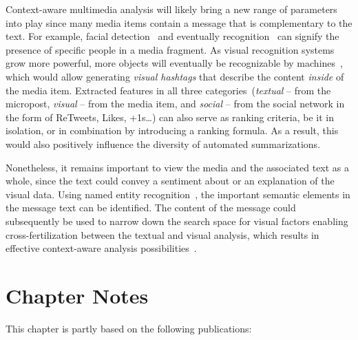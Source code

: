 Context-aware multimedia analysis will likely bring a new range of parameters into play since many media items contain a message that is complementary to the text. For example, facial detection~\cite{ViolaJones} and eventually recognition~\cite{Wright} can signify the presence of specific people in a media fragment.
As visual recognition systems grow more powerful, more objects will eventually be recognizable by machines~\cite{Serre}, which would allow generating \emph{visual hashtags} that describe the content \emph{inside} of the media item. Extracted features in all three categories~(\emph{textual} -- from the micropost, \emph{visual} -- from the media item, and \emph{social} -- from the social network in the form of ReTweets, Likes, +1s\ldots) can also serve as ranking criteria, be it in isolation, or in combination by introducing a ranking formula. As a result, this would also positively influence the diversity of automated summarizations.

Nonetheless, it remains important to view the media and the associated text as a whole, since the text could convey a sentiment about or an explanation of the visual data. Using named entity recognition~\cite{NERD,AddingMeaningToMicroposts}, the important semantic elements in the message text can be identified. The content of the message could subsequently be used to narrow down the search space for visual factors enabling cross-fertilization between the textual and visual analysis, which results in effective context-aware analysis possibilities~\cite{verborgh_mtap_2011}.

\section*{Chapter Notes}
This chapter is partly based on the following publications:
